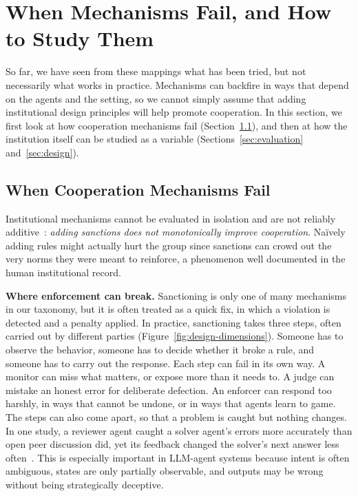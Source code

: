 \documentclass[runningheads]{llncs}
\begin{document}
\section{When Mechanisms Fail, and How to Study Them}\label{sec:study}

So far, we have seen from these mappings what has been tried, but not necessarily what works in practice. Mechanisms can backfire in ways that depend on the agents and the setting, so we cannot simply assume that adding institutional design principles will help promote cooperation. In this section, we first look at how cooperation mechanisms fail (Section~\mbox{\ref{sec:failures}}), and then at how the institution itself can be studied as a variable (Sections~\mbox{\ref{sec:evaluation}} and~\mbox{\ref{sec:design}}).

\subsection{When Cooperation Mechanisms Fail}\label{sec:failures}

Institutional mechanisms cannot be evaluated in isolation and are not reliably additive~\citep{herrmannAntisocialPunishmentSocieties2008}: \textit{adding sanctions does not monotonically improve cooperation}. Na\"ively adding rules might actually hurt the group since sanctions can crowd out the very norms they were meant to reinforce, a phenomenon well documented in the human institutional record.

\textbf{Where enforcement can break.} Sanctioning is only one of many mechanisms in our taxonomy, but it is often treated as a quick fix, in which a violation is detected and a penalty applied. In practice, sanctioning takes three steps, often carried out by different parties (Figure~\mbox{\ref{fig:design-dimensions}}). Someone has to observe the behavior, someone has to decide whether it broke a rule, and someone has to carry out the response. Each step can fail in its own way. A monitor can miss what matters, or expose more than it needs to. A judge can mistake an honest error for deliberate defection. An enforcer can respond too harshly, in ways that cannot be undone, or in ways that agents learn to game. The steps can also come apart, so that a problem is caught but nothing changes. In one study, a reviewer agent caught a solver agent's errors more accurately than open peer discussion did, yet its feedback changed the solver's next answer less often~\mbox{\citep{yang2026uptake}}. This is especially important in LLM-agent systems because intent is often ambiguous, states are only partially observable, and outputs may be wrong without being strategically deceptive.
\end{document}
